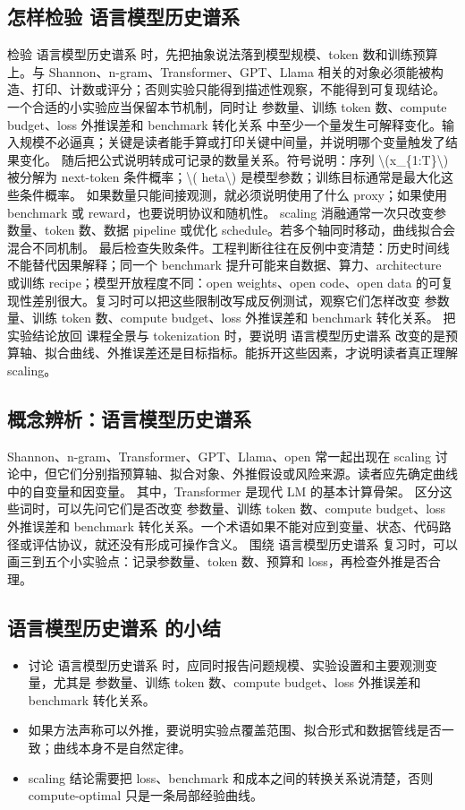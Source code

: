\documentclass[a4paper]{article}
\begin{document}
\subsection{怎样检验 语言模型历史谱系}
检验 语言模型历史谱系 时，先把抽象说法落到模型规模、token 数和训练预算上。与 Shannon、n-gram、Transformer、GPT、Llama 相关的对象必须能被构造、打印、计数或评分；否则实验只能得到描述性观察，不能得到可复现结论。
一个合适的小实验应当保留本节机制，同时让 参数量、训练 token 数、compute budget、loss 外推误差和 benchmark 转化关系 中至少一个量发生可解释变化。输入规模不必逼真；关键是读者能手算或打印关键中间量，并说明哪个变量触发了结果变化。
随后把公式说明转成可记录的数量关系。符号说明：序列 \textbackslash{}(x\_\{1:T\}\textbackslash{}) 被分解为 next-token 条件概率；\textbackslash{}( heta\textbackslash{}) 是模型参数；训练目标通常是最大化这些条件概率。 如果数量只能间接观测，就必须说明使用了什么 proxy；如果使用 benchmark 或 reward，也要说明协议和随机性。
scaling 消融通常一次只改变参数量、token 数、数据 pipeline 或优化 schedule。若多个轴同时移动，曲线拟合会混合不同机制。
最后检查失败条件。工程判断往往在反例中变清楚：历史时间线不能替代因果解释；同一个 benchmark 提升可能来自数据、算力、architecture 或训练 recipe；模型开放程度不同：open weights、open code、open data 的可复现性差别很大。复习时可以把这些限制改写成反例测试，观察它们怎样改变 参数量、训练 token 数、compute budget、loss 外推误差和 benchmark 转化关系。
把实验结论放回 课程全景与 tokenization 时，要说明 语言模型历史谱系 改变的是预算轴、拟合曲线、外推误差还是目标指标。能拆开这些因素，才说明读者真正理解 scaling。
\subsection{概念辨析：语言模型历史谱系}
Shannon、n-gram、Transformer、GPT、Llama、open 常一起出现在 scaling 讨论中，但它们分别指预算轴、拟合对象、外推假设或风险来源。读者应先确定曲线中的自变量和因变量。
其中，Transformer 是现代 LM 的基本计算骨架。
区分这些词时，可以先问它们是否改变 参数量、训练 token 数、compute budget、loss 外推误差和 benchmark 转化关系。一个术语如果不能对应到变量、状态、代码路径或评估协议，就还没有形成可操作含义。
围绕 语言模型历史谱系 复习时，可以画三到五个小实验点：记录参数量、token 数、预算和 loss，再检查外推是否合理。
\subsection{语言模型历史谱系 的小结}
\begin{itemize}
\item 讨论 语言模型历史谱系 时，应同时报告问题规模、实验设置和主要观测变量，尤其是 参数量、训练 token 数、compute budget、loss 外推误差和 benchmark 转化关系。
\item 如果方法声称可以外推，要说明实验点覆盖范围、拟合形式和数据管线是否一致；曲线本身不是自然定律。
\item scaling 结论需要把 loss、benchmark 和成本之间的转换关系说清楚，否则 compute-optimal 只是一条局部经验曲线。
\end{itemize}
\end{document}
